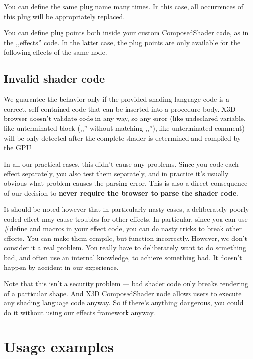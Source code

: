 \documentclass{acmsiggraph}                     %
\begin{document}
You can define the same plug name many times. In this case,
all occurrences of this plug will be appropriately replaced.

You can define plug points both inside your custom ComposedShader code,
as in the ,,effects'' code. In the latter case, the plug points
are only available for the following effects of the same node.

\subsection{Invalid shader code}

We guarantee the behavior only if the provided shading language code
is a correct, self-contained code that can be inserted into a procedure body.
X3D browser doesn't validate code in any way, so any error (like undeclared
variable, like unterminated block (,,{'' without matching ,,}''),
like unterminated comment) will be only detected after the complete shader
is determined and compiled by the GPU.

In all our practical cases, this didn't cause any problems.
Since you code each effect separately, you also test them separately,
and in practice it's usually obvious what problem causes the parsing error.
This is also a direct consequence of our decision to \textbf{never require
the browser to parse the shader code}.

It should be noted however that in particularly nasty cases,
a deliberately poorly coded effect may cause troubles for other effects.
In particular, since you can use \#define and macros in your effect code,
you can do nasty tricks to break other effects. You can make them compile,
but function incorrectly. However, we don't consider
it a real problem. You really have to deliberately want to do something bad,
and often use an internal knowledge, to achieve something bad.
It doesn't happen by accident in our experience.

Note that this isn't a security problem --- bad shader code only breaks
rendering of a particular shape. And X3D ComposedShader node allows users
to execute any shading language code anyway. So if there's anything dangerous,
you could do it without using our effects framework anyway.

\section{Usage examples}
\end{document}
